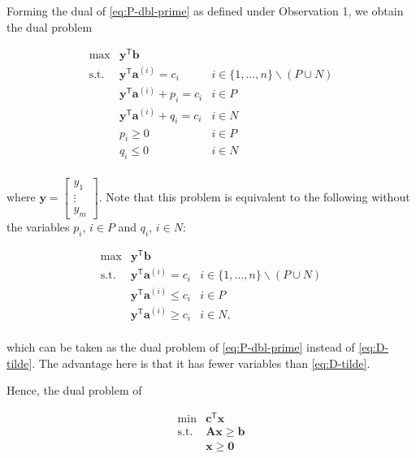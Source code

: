 \documentclass[]{book}
\newcommand{\T}{\mathsf{T}}
\newcommand{\mm}[1]{\mathbf{#1}}
\renewcommand{\vec}[1]{\mathbf{#1}}
\theoremstyle{definition}
\theoremstyle{definition}
\theoremstyle{remark}
\begin{document}
Forming the dual of \eqref{eq:P-dbl-prime} as defined under Observation 1,
we obtain the dual problem

\begin{equation}
\begin{array}{rll}
\max & \vec{y}^\T\vec{b} \\
\mbox{s.t.} & 
 \vec{y}^\T\vec{a}^{(i)} = c_i & i \in \{1,\ldots,n\}\backslash 
(P\cup N) \\
&\vec{y}^\T\vec{a}^{(i)} + p_i = c_i & i \in P \\
& \vec{y}^\T\vec{a}^{(i)} + q_i = c_i & i \in N \\
& p_i \geq 0 & i \in P \\
& q_i \leq 0 & i \in N \\
\end{array} \label{eq:D-tilde}
\end{equation}

where \(\vec{y} = \begin{bmatrix} y_1\\ \vdots \\ y_m\end{bmatrix}\).
Note that this problem is equivalent to the following without the
variables \(p_i\), \(i \in P\) and \(q_i\), \(i \in N\):

\begin{equation}
\begin{array}{rll}
\max & \vec{y}^\T\vec{b} \\
\mbox{s.t.} & 
 \vec{y}^\T\vec{a}^{(i)} = c_i & i \in \{1,\ldots,n\}\backslash 
(P\cup N) \\
&\vec{y}^\T\vec{a}^{(i)} \leq c_i & i \in P      \\
& \vec{y}^\T\vec{a}^{(i)} \geq c_i & i \in N,     \\
\end{array}
\end{equation}

which can be taken as the dual problem of \eqref{eq:P-dbl-prime} instead
of \eqref{eq:D-tilde}. The advantage here is that it has fewer variables
than \eqref{eq:D-tilde}.

Hence, the dual problem of

\begin{equation*}
\begin{array}{rl}
\min & \vec{c}^\T\vec{x}  \\
\mbox{s.t.} & \mm{A}\vec{x} \geq \vec{b} \\
& \vec{x} \geq \vec{0}
\end{array}
\end{equation*}
\end{document}
